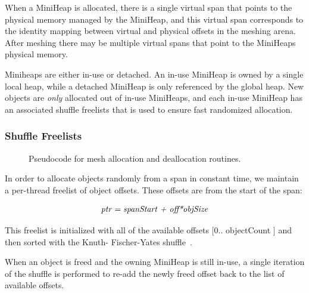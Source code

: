 When a MiniHeap is allocated, there is a single virtual span that
points to the physical memory managed by the MiniHeap, and this
virtual span corresponds to the identity mapping between virtual and
physical offsets in the meshing arena.  After meshing there may be
multiple virtual spans that point to the MiniHeaps physical memory.

Miniheaps are either in-use or detached.  An in-use MiniHeap is owned
by a single local heap, while a detached MiniHeap is only referenced
by the global heap.  New objects are \textit{only} allocated out of
in-use MiniHeaps, and each in-use MiniHeap has an associated shuffle
freelists that is used to ensure fast randomized allocation.

\subsubsection{Shuffle Freelists}

\begin{figure}[!ht]
  
  
  
  
  \caption{Pseudocode for mesh allocation and deallocation routines.}
  \label{fig:malloc}
\end{figure}

In order to allocate objects randomly from a span in constant time, we
maintain a per-thread freelist of object offsets.  These offsets are
from the start of the span:

\vspace{-1.2em}
\begin{align*}
  \text{\textit{ptr}} = \text{\textit{spanStart + off*objSize}}
\end{align*}

This freelist is initialized with all of the available offsets $[0
  .. $ objectCount $]$ and then sorted with the Knuth-
Fischer-Yates shuffle~\cite{knuth:1981:semi}.

When an object is freed and the owning MiniHeap is still in-use, a
single iteration of the shuffle is performed to re-add the newly freed
offset back to the list of available offsets.

